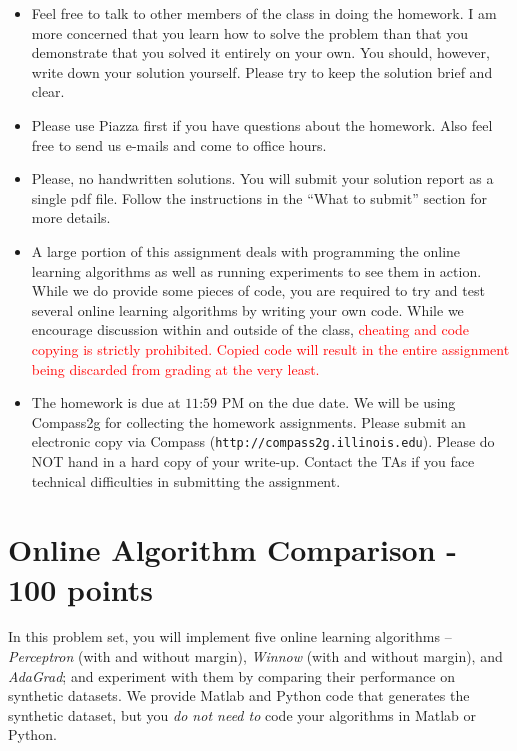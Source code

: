 
\usepackage{amsmath,amssymb,url,color}
\sloppy
\newcommand{\ignore}[1]{}

\oddsidemargin 0in
\evensidemargin 0in
\textwidth 6.5in
\topmargin -0.5in
\textheight 9.0in




\begin{footnotesize}
\begin{itemize}
\item Feel free to talk to other members of the class in doing the homework.
I am more concerned that you learn how to solve the problem than that you
demonstrate that you solved it entirely on your own.  You should, however,
write down your solution yourself.  Please try to keep the solution brief
and clear.

\item Please use Piazza first if you have questions about the homework.
Also feel free to send us e-mails and come to office hours.

\item Please, no handwritten solutions.  You will submit your solution
report as a single pdf file. Follow the instructions in the ``What to submit''
section for more details.

\item A large portion of this assignment deals with programming the online
learning algorithms as well as running experiments to see them in action.
While we do provide some pieces of code, you are required to try and test
several online learning algorithms by writing your own code.  While we
encourage discussion within and outside of the class,
\textcolor{red}{cheating and code copying is strictly prohibited.  Copied
code will result in the entire assignment being discarded from grading at
the very least.}

\item The homework is due at $11$:$59$ PM on the due date.  We will be using
Compass2g for collecting the homework assignments. Please submit an
electronic copy via Compass (\texttt{http://compass2g.illinois.edu}). Please
do NOT hand in a hard copy of your write-up.  Contact the TAs if you
  face technical difficulties in submitting the assignment.
\end{itemize}
\end{footnotesize}

\section*{Online Algorithm Comparison - 100 points}
In this problem set, you will implement five online learning
algorithms -- \emph{Perceptron} (with and without margin), 
\emph{Winnow} (with and without margin), and \emph{AdaGrad}; 
and experiment with them by comparing their performance on synthetic datasets. 
We provide Matlab and Python code that generates the synthetic dataset, but you 
\emph{do not need to} code your algorithms in Matlab or Python.


